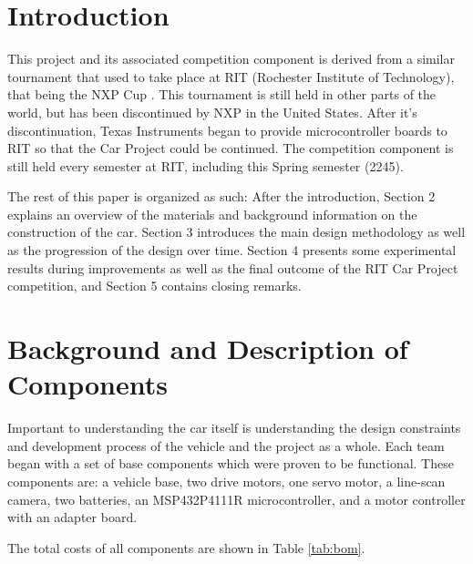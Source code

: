 \documentclass[conference]{IEEEtran}
\begin{document}
\section{Introduction}
    This project and its associated competition component is derived from
    a similar tournament that used to take place at RIT 
    (Rochester Institute of Technology), that being the NXP
    Cup \cite{b1}. This tournament is still held in other parts of the world, but has
    been discontinued by NXP in the United States. After it's discontinuation, Texas Instruments began to provide
    microcontroller boards to RIT so that the Car Project could be continued.
    The competition component is still held every semester at RIT, including
    this Spring semester (2245).

    The rest of this paper is organized as such: After the introduction,
    Section 2 explains an overview of the materials and background information
    on the construction of the car. Section 3 introduces the main design
    methodology as well as the progression of the design over time. Section
    4 presents some experimental results during improvements as well as
    the final outcome of the RIT Car Project competition, and Section 5
    contains closing remarks.

\section{Background and Description of Components}
    Important to understanding the car itself is understanding the design
    constraints and development process of the vehicle and the project as a
    whole. Each team began with a set of base components which were proven to
    be functional. These components are: a vehicle base, two drive motors,
    one servo motor, a line-scan camera, two batteries, an MSP432P4111R
    microcontroller, and a motor controller with an adapter board. 

    The total costs of all components are shown in Table \ref{tab:bom}.
\end{document}
